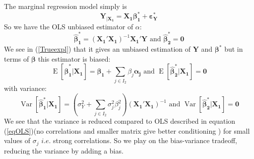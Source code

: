 \documentclass[11pt,a4paper]{article}
\begin{document}
	The marginal regression model simply is
	\begin{equation}
		\boldsymbol{Y}_{|\boldsymbol{X_1}}= \boldsymbol{X_1}\boldsymbol{\beta_1^*}+ \boldsymbol{\varepsilon_Y^*}
	\end{equation}			
		So we have the \textsc{OLS} unbiased estimator of $\alpha$: 
		\begin{equation}
			\boldsymbol{\hat\beta_1^*} = (\boldsymbol{X_1}' \boldsymbol{X_1})^{-1}\boldsymbol{X_1}'\boldsymbol{Y}  \textrm{ and }\boldsymbol{\hat\beta_2^*} = \boldsymbol{0}
		\end{equation}
		We see in (\ref{Trueexpl}) that it gives an unbiased estimation of $\boldsymbol{Y}$ and $\boldsymbol{\beta^*}$
		but in terms of $\boldsymbol{\beta}$ this estimator is biased:
		\begin{equation}
			\operatorname{E}[\boldsymbol{\hat\beta_1^*}|\boldsymbol{X_1}]=\boldsymbol{\beta_1}+\sum_{j \in I_2}\beta_{j}\boldsymbol{\alpha_j} \textrm{ and }\operatorname{E}[\boldsymbol{\hat\beta_2^*}|\boldsymbol{X_1}]=\boldsymbol{0}
		\end{equation}
		with variance:
		\begin{equation}
			\operatorname{Var}[\boldsymbol{\hat\beta_1^*}|\boldsymbol{X_1}]= (\sigma^2_Y+\sum_{j \in I_2}\sigma^2_{j}\beta_{j}^2 )(\boldsymbol{X_1}' \boldsymbol{X_1})^{-1}  \textrm{ and }\operatorname{Var}[\boldsymbol{\hat\beta_2^*}|\boldsymbol{X_1}]= \boldsymbol{0} 
		\end{equation}
		We see that the variance is reduced compared to OLS described in equation (\ref{eqOLS})(no correlations and smaller matrix give better conditioning ) for small values of $\sigma_j$ $i.e.$ strong correlations. So we play on the bias-variance tradeoff, reducing the variance by adding a bias.		
			 \\
\end{document}
